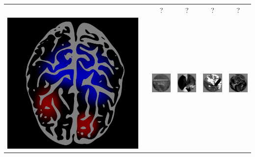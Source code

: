 \documentclass{beamer}
\begin{document}
\begin{frame}
\begin{center}
\begin{tabular}{c|c|cccc}
\hline
 & & ? & ? & ? & ? \\
\includegraphics[scale = 0.035]{brain1.png} & \hspace{0.5in}
& \includegraphics[scale = .26]{img1.png}
& \includegraphics[scale = .26]{img2.png}
& \includegraphics[scale = .26]{img3.png}
& \includegraphics[scale = .26]{img4.png}\\
\hline
\end{tabular}
\end{center}
\end{frame}
\end{document}
